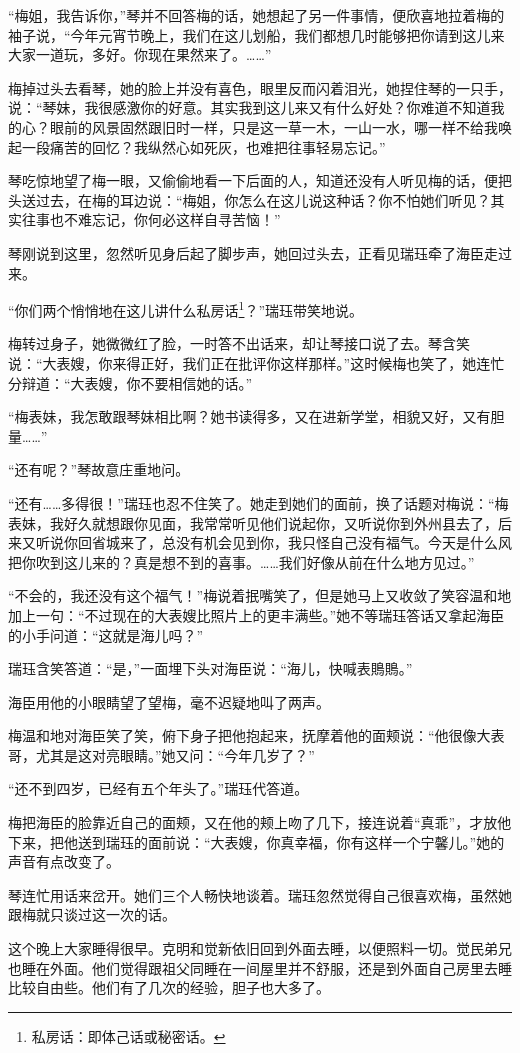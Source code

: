 \par “梅姐，我告诉你，”琴并不回答梅的话，她想起了另一件事情，便欣喜地拉着梅的袖子说，“今年元宵节晚上，我们在这儿划船，我们都想几时能够把你请到这儿来大家一道玩，多好。你现在果然来了。……”
\par 梅掉过头去看琴，她的脸上并没有喜色，眼里反而闪着泪光，她捏住琴的一只手，说：“琴妹，我很感激你的好意。其实我到这儿来又有什么好处？你难道不知道我的心？眼前的风景固然跟旧时一样，只是这一草一木，一山一水，哪一样不给我唤起一段痛苦的回忆？我纵然心如死灰，也难把往事轻易忘记。”
\par 琴吃惊地望了梅一眼，又偷偷地看一下后面的人，知道还没有人听见梅的话，便把头送过去，在梅的耳边说：“梅姐，你怎么在这儿说这种话？你不怕她们听见？其实往事也不难忘记，你何必这样自寻苦恼！”
\par 琴刚说到这里，忽然听见身后起了脚步声，她回过头去，正看见瑞珏牵了海臣走过来。
\par “你们两个悄悄地在这儿讲什么私房话\footnote{私房话：即体己话或秘密话。}？”瑞珏带笑地说。
\par 梅转过身子，她微微红了脸，一时答不出话来，却让琴接口说了去。琴含笑说：“大表嫂，你来得正好，我们正在批评你这样那样。”这时候梅也笑了，她连忙分辩道：“大表嫂，你不要相信她的话。”
\par “梅表妹，我怎敢跟琴妹相比啊？她书读得多，又在进新学堂，相貌又好，又有胆量……”
\par “还有呢？”琴故意庄重地问。
\par “还有……多得很！”瑞珏也忍不住笑了。她走到她们的面前，换了话题对梅说：“梅表妹，我好久就想跟你见面，我常常听见他们说起你，又听说你到外州县去了，后来又听说你回省城来了，总没有机会见到你，我只怪自己没有福气。今天是什么风把你吹到这儿来的？真是想不到的喜事。……我们好像从前在什么地方见过。”
\par “不会的，我还没有这个福气！”梅说着抿嘴笑了，但是她马上又收敛了笑容温和地加上一句：“不过现在的大表嫂比照片上的更丰满些。”她不等瑞珏答话又拿起海臣的小手问道：“这就是海儿吗？”
\par 瑞珏含笑答道：“是，”一面埋下头对海臣说：“海儿，快喊表鵙鵙。”
\par 海臣用他的小眼睛望了望梅，毫不迟疑地叫了两声。
\par 梅温和地对海臣笑了笑，俯下身子把他抱起来，抚摩着他的面颊说：“他很像大表哥，尤其是这对亮眼睛。”她又问：“今年几岁了？”
\par “还不到四岁，已经有五个年头了。”瑞珏代答道。
\par 梅把海臣的脸靠近自己的面颊，又在他的颊上吻了几下，接连说着“真乖”，才放他下来，把他送到瑞珏的面前说：“大表嫂，你真幸福，你有这样一个宁馨儿。”她的声音有点改变了。
\par 琴连忙用话来岔开。她们三个人畅快地谈着。瑞珏忽然觉得自己很喜欢梅，虽然她跟梅就只谈过这一次的话。
\par 这个晚上大家睡得很早。克明和觉新依旧回到外面去睡，以便照料一切。觉民弟兄也睡在外面。他们觉得跟祖父同睡在一间屋里并不舒服，还是到外面自己房里去睡比较自由些。他们有了几次的经验，胆子也大多了。



